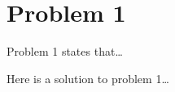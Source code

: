 \documentclass[../hwk01.tex]{subfile}
\begin{document}
\section*{Problem 1}\label{prob:1}
Problem 1 states that\ldots 
\begin{solution}
Here is a solution to problem 1\ldots
\end{solution}
\end{document}

